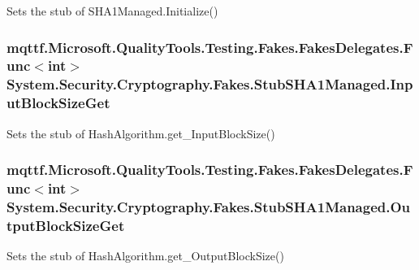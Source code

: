 Sets the stub of S\-H\-A1\-Managed.\-Initialize()

\hypertarget{class_system_1_1_security_1_1_cryptography_1_1_fakes_1_1_stub_s_h_a1_managed_aa301f625a809a38edd6d992312cbe509}{
\subsubsection[{Input\-Block\-Size\-Get}]{\setlength{\rightskip}{0pt plus 5cm}mqttf.\-Microsoft.\-Quality\-Tools.\-Testing.\-Fakes.\-Fakes\-Delegates.\-Func$<$int$>$ System.\-Security.\-Cryptography.\-Fakes.\-Stub\-S\-H\-A1\-Managed.\-Input\-Block\-Size\-Get}}\label{class_system_1_1_security_1_1_cryptography_1_1_fakes_1_1_stub_s_h_a1_managed_aa301f625a809a38edd6d992312cbe509}


Sets the stub of Hash\-Algorithm.\-get\-\_\-\-Input\-Block\-Size()

\hypertarget{class_system_1_1_security_1_1_cryptography_1_1_fakes_1_1_stub_s_h_a1_managed_aa5da1c99babd332a07c5b4231fb0025d}{
\subsubsection[{Output\-Block\-Size\-Get}]{\setlength{\rightskip}{0pt plus 5cm}mqttf.\-Microsoft.\-Quality\-Tools.\-Testing.\-Fakes.\-Fakes\-Delegates.\-Func$<$int$>$ System.\-Security.\-Cryptography.\-Fakes.\-Stub\-S\-H\-A1\-Managed.\-Output\-Block\-Size\-Get}}\label{class_system_1_1_security_1_1_cryptography_1_1_fakes_1_1_stub_s_h_a1_managed_aa5da1c99babd332a07c5b4231fb0025d}


Sets the stub of Hash\-Algorithm.\-get\-\_\-\-Output\-Block\-Size()



